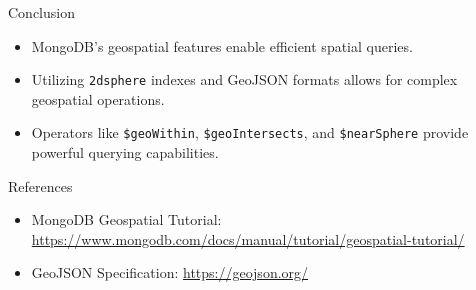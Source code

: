 \documentclass{beamer}
\begin{document}

\begin{frame}{Conclusion}
	\begin{itemize}
		\item MongoDB's geospatial features enable efficient spatial queries.
		\item Utilizing \texttt{2dsphere} indexes and GeoJSON formats allows for complex geospatial operations.
		\item Operators like \texttt{\$geoWithin}, \texttt{\$geoIntersects}, and \texttt{\$nearSphere} provide powerful querying capabilities.
	\end{itemize}
\end{frame}

\begin{frame}{References}
	\begin{itemize}
		\item MongoDB Geospatial Tutorial: \url{https://www.mongodb.com/docs/manual/tutorial/geospatial-tutorial/}
		\item GeoJSON Specification: \url{https://geojson.org/}
	\end{itemize}
\end{frame}
\end{document}
